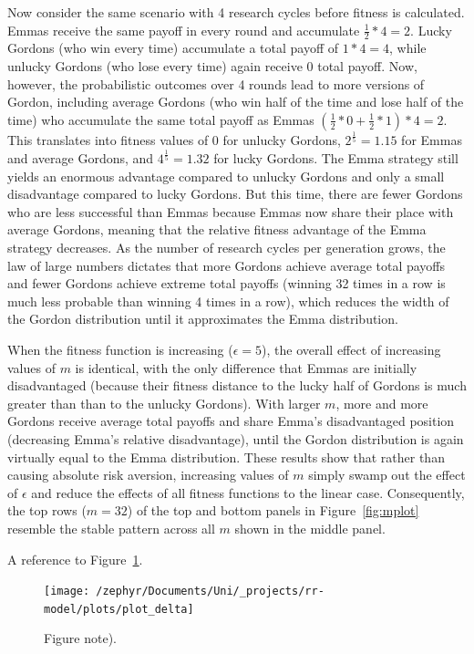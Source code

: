 \documentclass[british,,doc,mask,floatsintext]{apa6}
\begin{document}
Now consider the same scenario with 4 research cycles before fitness is calculated.
Emmas receive the same payoff in every round and accumulate \(\frac{1}{2} * 4 = 2\).
Lucky Gordons (who win every time) accumulate a total payoff of \(1*4 = 4\), while unlucky Gordons (who lose every time) again receive 0 total payoff.
Now, however, the probabilistic outcomes over 4 rounds lead to more versions of Gordon, including average Gordons (who win half of the time and lose half of the time) who accumulate the same total payoff as Emmas \((\frac{1}{2}*0 + \frac{1}{2}*1)*4 = 2\).
This translates into fitness values of 0 for unlucky Gordons, \(2^{\frac{1}{5}} = 1.15\) for Emmas and average Gordons, and \(4^{\frac{1}{5}} = 1.32\) for lucky Gordons.
The Emma strategy still yields an enormous advantage compared to unlucky Gordons and only a small disadvantage compared to lucky Gordons.
But this time, there are fewer Gordons who are less successful than Emmas because Emmas now share their place with average Gordons, meaning that the relative fitness advantage of the Emma strategy decreases.
As the number of research cycles per generation grows, the law of large numbers dictates that more Gordons achieve average total payoffs and fewer Gordons achieve extreme total payoffs (winning 32 times in a row is much less probable than winning 4 times in a row), which reduces the width of the Gordon distribution until it approximates the Emma distribution.

When the fitness function is increasing (\(\epsilon = 5\)), the overall effect of increasing values of \(m\) is identical, with the only difference that Emmas are initially disadvantaged (because their fitness distance to the lucky half of Gordons is much greater than than to the unlucky Gordons).
With larger \(m\), more and more Gordons receive average total payoffs and share Emma's disadvantaged position (decreasing Emma's relative disadvantage), until the Gordon distribution is again virtually equal to the Emma distribution.
These results show that rather than causing absolute risk aversion, increasing values of \(m\) simply swamp out the effect of \(\epsilon\) and reduce the effects of all fitness functions to the linear case.
Consequently, the top rows (\(m = 32\)) of the top and bottom panels in Figure~\ref{fig:mplot} resemble the stable pattern across all \(m\) shown in the middle panel.

A reference to Figure~\ref{fig:deltaplot}.



\begin{figure}
\texttt{[image: /zephyr/Documents/Uni/\_projects/rr-model/plots/plot\_delta]} \caption{Figure note).}\label{fig:deltaplot}
\end{figure}
\end{document}
